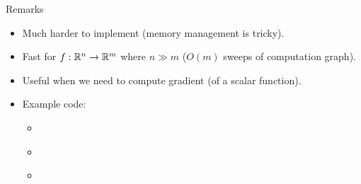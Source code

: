 \begin{frame}{Remarks}
\begin{itemize}
    \item Much harder to implement (memory management is tricky).
    \item Fast for $f:\mathbb{R}^n \to \mathbb{R}^m$ where $n \gg m$ ($O(m)$ sweeps of computation graph).
    \item Useful when we need to compute gradient (of a scalar function).
    \item Example code:
    \begin{itemize}
        \item \href{https://github.com/JamesYang007/FastAD-Report/blob/master/slides/stanford-01272022/examples/src/rv_ad.cpp}{}
        \item \href{https://github.com/JamesYang007/FastAD-Report/blob/master/slides/stanford-01272022/examples/src/for_each.cpp}{}
        \item \href{https://github.com/JamesYang007/FastAD-Report/blob/master/slides/stanford-01272022/examples/src/if_else.cpp}{}
    \end{itemize}
\end{itemize} 
\end{frame}
